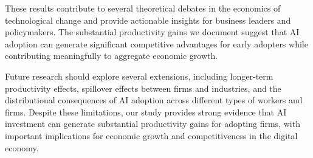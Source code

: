 \documentclass[12pt, a4paper]{article}
\begin{document}
These results contribute to several theoretical debates in the economics of technological change and provide actionable insights for business leaders and policymakers. The substantial productivity gains we document suggest that AI adoption can generate significant competitive advantages for early adopters while contributing meaningfully to aggregate economic growth.

Future research should explore several extensions, including longer-term productivity effects, spillover effects between firms and industries, and the distributional consequences of AI adoption across different types of workers and firms. Despite these limitations, our study provides strong evidence that AI investment can generate substantial productivity gains for adopting firms, with important implications for economic growth and competitiveness in the digital economy.

\newpage
\end{document}
